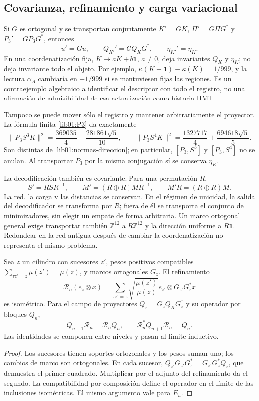 \subsection{Covarianza, refinamiento y carga variacional}
\label{lib01:covarianza}

Si \(G\) es ortogonal y se transportan conjuntamente
\(K'=GK\), \(\Pi'=G\Pi G^*\) y \(P_3'=GP_3G^*\), entonces
\[
 u'=Gu,\qquad Q_{K'}'=GQ_KG^*,\qquad \eta_{K'}'=\eta_K.
\]
En una coordenatización fija, \(K\mapsto aK+b\mathbf1\), \(a\ne0\), deja
invariantes \(Q_K\) y \(\eta_K\); no deja invariante todo el objeto.
Por ejemplo, \(\kappa(K+\mathbf1)-\kappa(K)=1/999\), y la lectura
\(\alpha_A\) cambiaría en \(-1/999\) si se mantuviesen fijas las
regiones. Es un contraejemplo algebraico a identificar el descriptor con
todo el registro, no una afirmación de admisibilidad de esa actualización
como historia HMT.

Tampoco se puede mover sólo el registro y mantener arbitrariamente el
proyector. La fórmula finita \eqref{lib01:P3} da exactamente
\[
 \|P_3S^3K\|^2=\frac{369035}{4}-\frac{281861\sqrt5}{10},
 \qquad
 \|P_3S^4K\|^2=\frac{1327717}{4}+\frac{694618\sqrt5}{5}.
\]
Son distintas de \eqref{lib01:normas-direccion}; en particular,
\([P_3,S^3]\) y \([P_3,S^4]\) no se anulan. Al transportar
\(P_3\) por la misma conjugación sí se conserva \(\eta_K\).

La decodificación también es covariante. Para una permutación \(R\),
\[
 S'=RSR^{-1},\qquad M'=(R\oplus R)MR^{-1},\qquad
 M'R=(R\oplus R)M.
\]
La red, la carga y las distancias se conservan. En el régimen de unicidad,
la salida del decodificador se transforma por \(R\); fuera de él se
transporta el conjunto de minimizadores, sin elegir un empate de forma
arbitraria. Un marco ortogonal general exige transportar también
\(\mathbb Z^{12}\) a \(R\mathbb Z^{12}\) y la dirección uniforme
a \(R\mathbf1\). Redondear en la red antigua después de cambiar la
coordenatización no representa el mismo problema.

\begin{proposition}
\label{lib01:refinamiento}
Sea \(z\) un cilindro con sucesores \(z'\), pesos positivos compatibles
\(\sum_{\tau z'=z}\mu(z')=\mu(z)\), y marcos ortogonales \(G_z\).
El refinamiento
\[
 \mathcal R_n(e_z\otimes x)=
 \sum_{\tau z'=z}\sqrt{\frac{\mu(z')}{\mu(z)}}
 e_{z'}\otimes G_{z'}G_z^*x
\]
es isométrico. Para el campo de proyectores
\(Q_z=G_zQ_KG_z^*\) y su operador por bloques \(Q_n\),
\[
 Q_{n+1}\mathcal R_n=\mathcal R_nQ_n,
 \qquad \mathcal R_n^*Q_{n+1}\mathcal R_n=Q_n.
\]
Las identidades se componen entre niveles y pasan al límite inductivo.
\end{proposition}
\begin{proof}
Los sucesores tienen soportes ortogonales y los pesos suman uno; los cambios
de marco son ortogonales. En cada sucesor,
\(Q_{z'}G_{z'}G_z^*=G_{z'}G_z^*Q_z\), que demuestra el primer
cuadrado. Multiplicar por el adjunto del refinamiento da el segundo.
La compatibilidad por composición define el operador en el límite de
las inclusiones isométricas. El mismo argumento vale para \(E_u\).
\end{proof}

